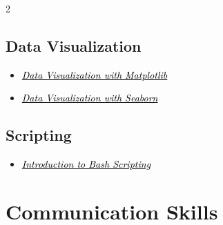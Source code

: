 \documentclass[
	10pt, %
]{RESUME}
\begin{document}
\begin{paracol}{2}
	\subsection{\textbf{Data Visualization}}

	\begin{itemize}

		\item[\faCertificate] \href{https://www.datacamp.com/statement-of-accomplishment/course/17c9ab4dc4eb990e81e2b675f3d6375691e66614?raw=1}
		      {\textcolor{black}{\textit{Data Visualization with Matplotlib}}}

		\item[\faCertificate] \href{https://www.datacamp.com/statement-of-accomplishment/course/0193c3a65db0fe46cd4d1dda686015f6964744bf?raw=1}
		      {\textcolor{black}{\textit{Data Visualization with Seaborn}}}
	\end{itemize}


	\subsection{\textbf{Scripting}}

	\begin{itemize}

		\item[\faCertificate] \href{https://www.datacamp.com/statement-of-accomplishment/course/af330fd7f2c7b67b78329c57e31171f67dd2daba?raw=1}
		      {\textcolor{black}{\textit{Introduction to Bash Scripting}}}

	\end{itemize}

	\break

	\section{Communication Skills}




\end{paracol}
\end{document}
